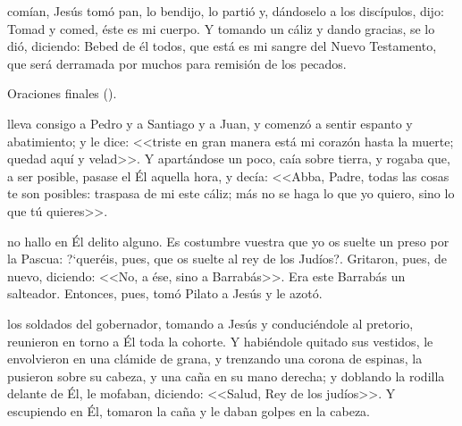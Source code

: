 \documentclass[10pt,oneside]{book}
\begin{document}
\begin{center}
      
\end{center}

comían, Jesús tomó pan, lo bendijo, lo partió y, dándoselo a los discípulos, dijo: Tomad y comed, éste es mi cuerpo. 
Y tomando un cáliz y dando gracias, se lo dió, diciendo: Bebed de él todos, que está es mi sangre del Nuevo Testamento, que será derramada por muchos 
para remisión de los pecados.

\begin{center}
      {} Oraciones finales ().
\end{center}

 lleva consigo a Pedro y a Santiago y a Juan, y comenzó a sentir espanto y abatimiento; y le dice: <<triste en gran manera está mi corazón hasta la muerte;
quedad aquí y velad>>. Y apartándose un poco, caía sobre tierra, y rogaba que, a ser posible, pasase el Él aquella hora, y decía: <<Abba, Padre, todas las cosas te son posibles:
traspasa de mi este cáliz; más no se haga lo que yo quiero, sino lo que tú quieres>>.\\[2mm]

\vspace{5mm}

 no hallo en Él delito alguno. Es costumbre vuestra que yo os suelte un preso por la Pascua: {?`}queréis, 
pues, que os suelte al rey de los Judíos?. Gritaron, pues, de nuevo, diciendo: <<No, a ése, sino a Barrabás>>. 
Era este Barrabás un salteador. Entonces, pues, tomó Pilato a Jesús y le azotó. 

\begin{center}
      
\end{center}

los soldados del gobernador, tomando a Jesús y conduciéndole al pretorio, reunieron en torno a Él toda la cohorte. 
Y habiéndole quitado sus vestidos, le envolvieron en una clámide de grana, y trenzando una corona de espinas, la pusieron sobre su cabeza, 
y una caña en su mano derecha; y doblando la rodilla delante de Él, le mofaban, diciendo: <<Salud, Rey de los judíos>>. Y escupiendo en Él, 
tomaron la caña y le daban golpes en la cabeza.
\end{document}
